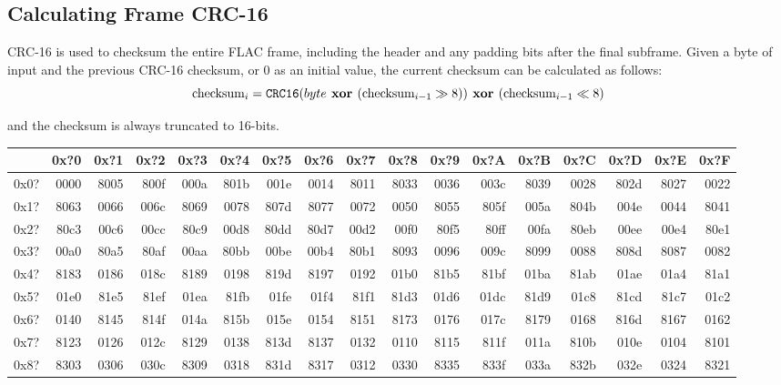 \clearpage

\subsection{Calculating Frame CRC-16}
\label{flac:verify_crc16}
CRC-16 is used to checksum the entire FLAC frame, including the header
and any padding bits after the final subframe.
Given a byte of input and the previous CRC-16 checksum,
or 0 as an initial value, the current checksum can be calculated as follows:
\begin{equation}
\text{checksum}_i = \texttt{CRC16}(byte\textbf{ xor }(\text{checksum}_{i - 1} \gg 8 ))\textbf{ xor }(\text{checksum}_{i - 1} \ll 8)
\end{equation}
\par
\noindent
and the checksum is always truncated to 16-bits.
\begin{table}[h]
{\ttfamily
\begin{tabular}{|r||r|r|r|r|r|r|r|r|r|r|r|r|r|r|r|r|}
\hline
 & 0x?0 & 0x?1 & 0x?2 & 0x?3 & 0x?4 & 0x?5 & 0x?6 & 0x?7 & 0x?8 & 0x?9 & 0x?A & 0x?B & 0x?C & 0x?D & 0x?E & 0x?F \\
\hline
0x0? & 0000 & 8005 & 800f & 000a & 801b & 001e & 0014 & 8011 & 8033 & 0036 & 003c & 8039 & 0028 & 802d & 8027 & 0022 \\
0x1? & 8063 & 0066 & 006c & 8069 & 0078 & 807d & 8077 & 0072 & 0050 & 8055 & 805f & 005a & 804b & 004e & 0044 & 8041 \\
0x2? & 80c3 & 00c6 & 00cc & 80c9 & 00d8 & 80dd & 80d7 & 00d2 & 00f0 & 80f5 & 80ff & 00fa & 80eb & 00ee & 00e4 & 80e1 \\
0x3? & 00a0 & 80a5 & 80af & 00aa & 80bb & 00be & 00b4 & 80b1 & 8093 & 0096 & 009c & 8099 & 0088 & 808d & 8087 & 0082 \\
0x4? & 8183 & 0186 & 018c & 8189 & 0198 & 819d & 8197 & 0192 & 01b0 & 81b5 & 81bf & 01ba & 81ab & 01ae & 01a4 & 81a1 \\
0x5? & 01e0 & 81e5 & 81ef & 01ea & 81fb & 01fe & 01f4 & 81f1 & 81d3 & 01d6 & 01dc & 81d9 & 01c8 & 81cd & 81c7 & 01c2 \\
0x6? & 0140 & 8145 & 814f & 014a & 815b & 015e & 0154 & 8151 & 8173 & 0176 & 017c & 8179 & 0168 & 816d & 8167 & 0162 \\
0x7? & 8123 & 0126 & 012c & 8129 & 0138 & 813d & 8137 & 0132 & 0110 & 8115 & 811f & 011a & 810b & 010e & 0104 & 8101 \\
0x8? & 8303 & 0306 & 030c & 8309 & 0318 & 831d & 8317 & 0312 & 0330 & 8335 & 833f & 033a & 832b & 032e & 0324 & 8321 \\

\end{tabular}}
\end{table}
